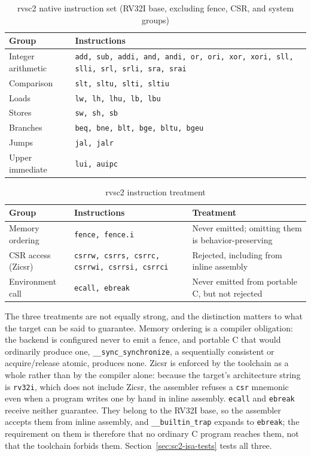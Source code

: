 \begin{table}[htb]
\centering
\caption{rvsc2 native instruction set (RV32I base, excluding fence, CSR, and system groups)}
\label{tab:rvsc2-isa}
\begin{tabular}{lp{11.9cm}}
\toprule
\textbf{Group} & \textbf{Instructions} \\
\midrule
Integer arithmetic & \texttt{add, sub, addi, and, andi, or, ori, xor, xori, sll, slli, srl, srli, sra, srai} \\
Comparison         & \texttt{slt, sltu, slti, sltiu} \\
Loads              & \texttt{lw, lh, lhu, lb, lbu} \\
Stores             & \texttt{sw, sh, sb} \\
Branches           & \texttt{beq, bne, blt, bge, bltu, bgeu} \\
Jumps              & \texttt{jal, jalr} \\
Upper immediate    & \texttt{lui, auipc} \\
\bottomrule
\end{tabular}
\end{table}

\begin{table}[htb]
\centering
\caption{rvsc2 instruction treatment}
\label{tab:rvsc2-treatment}
\begin{tabular}{p{2.6cm}p{4.6cm}p{6.4cm}}
\toprule
\textbf{Group} & \textbf{Instructions} & \textbf{Treatment} \\
\midrule
Memory ordering & \texttt{fence, fence.i}
  & Never emitted; omitting them is behavior-preserving \\
CSR access (Zicsr) & \texttt{csrrw, csrrs, csrrc, csrrwi, csrrsi, csrrci}
  & Rejected, including from inline assembly \\
Environment call & \texttt{ecall, ebreak}
  & Never emitted from portable C, but not rejected \\
\bottomrule
\end{tabular}
\end{table}

The three treatments are not equally strong, and the distinction matters to what the target can be
said to guarantee. Memory ordering is a compiler obligation: the backend is configured never to emit a
fence, and portable C that would ordinarily produce one, \texttt{\_\_sync\_synchronize}, a
sequentially consistent or acquire/release atomic, produces none. Zicsr is enforced by the toolchain
as a whole rather than by the compiler alone: because the target's architecture string is
\texttt{rv32i}, which does not include Zicsr, the assembler refuses a \texttt{csr} mnemonic even when a
program writes one by hand in inline assembly. \texttt{ecall} and \texttt{ebreak} receive neither
guarantee. They belong to the RV32I base, so the assembler accepts them from inline assembly, and
\texttt{\_\_builtin\_trap} expands to \texttt{ebreak}; the requirement on them is therefore that no
ordinary C program reaches them, not that the toolchain forbids them.
Section~\ref{sec:sc2-isa-tests} tests all three.

